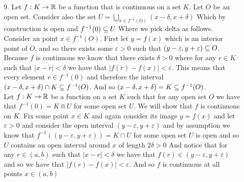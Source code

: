 \documentclass[12pt]{amsart}
\begin{document}
\begin{itemize}
    \item[9.] %
    Let $f:K\rightarrow\mathbb{R}$ be a function that is continuous on a set $K$. Let $O$ be an open set.
               Consider also the set $U=\bigcup_{x\in f^{-1}(O)}(x-\delta,x+\delta)$ Which by construction is open and $f^{-1}(0)\subseteq U$
               Where we pick delta as follows. 
               Consider an point $x\in f^{-1}(O)$. First let $y=f(x)$
               which is an interior point of $O$, and so there exists some $\varepsilon>0$ 
               such that $(y-\varepsilon, y+\varepsilon)\subseteq O$. Because $f$ is continuous we know that there exists $\delta>0$ 
               where for any $r\in K$ such that $|x-r|<\delta$ we have that $|f(r)-f(x)|<\varepsilon$. This means that every element $r\in f^{-1}(0)$
               and therefore the interval $(x-\delta,x+\delta)\cap K\subseteq f^{-1}(O)$. And so $(x-\delta,x+\delta)= K\subseteq f^{-1}(O)$.\\

               Let $f:K\rightarrow\mathbb{R}$ be a function on a set $K$ such that for any open set $O$ we have that $f^{-1}(0)=K\Cap U$ for some open set $U$.
               We will show that $f$ is continuous on $K$. Fix some point $x\in K$ and again consider its image $y=f(x)$ and let 
               $\varepsilon>0$ and consider the open interval $(y-\varepsilon, y+\varepsilon)$ and by assumption we know that 
               $f^{-1}((y-\varepsilon, y+\varepsilon))=K\cap U$ for some open set $U$ is open and so $U$ 
               contains an open interval around $x$ of length $2\delta>0$
               And notice that for any $r\in (a,b)$ such that $|x-r|<\delta$ we have that $f(r)\in(y-\varepsilon, y+\varepsilon)$ and so
               we have that $|f(r)-f(x)|<\varepsilon$. And so $f$ is continuous at all points $x\in(a,b)$

\end{itemize}
\end{document}
